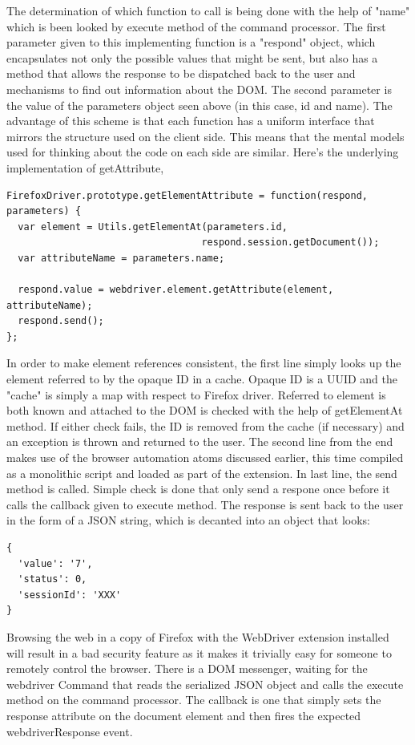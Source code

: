 \documentclass[article,type=msc,colorback,accentcolor=tud9c,twoside,11pt]{tudthesis}
\begin{document}
The determination of which function to call is being done with the help of "name" which is been looked by execute method of the command processor. The first parameter given to this implementing function is a "respond" object, which encapsulates not only the possible values that might be sent, but also has a method that allows the response to be dispatched back to the user and mechanisms to find out information about the DOM. The second parameter is the value of the parameters object seen above (in this case, id and name). The advantage of this scheme is that each function has a uniform interface that mirrors the structure used on the client side. This means that the mental models used for thinking about the code on each side are similar. Here's the underlying implementation of getAttribute,
 
 \begin{lstlisting}
FirefoxDriver.prototype.getElementAttribute = function(respond, parameters) {
  var element = Utils.getElementAt(parameters.id,
                                  respond.session.getDocument());
  var attributeName = parameters.name;

  respond.value = webdriver.element.getAttribute(element, attributeName);
  respond.send();
};
\end{lstlisting}

In order to make element references consistent, the first line simply looks up the element referred to by the opaque ID in a cache. Opaque ID is a UUID and the "cache" is simply a map with respect to Firefox driver. Referred to element is both known and attached to the DOM is checked with the help of getElementAt method. If either check fails, the ID is removed from the cache (if necessary) and an exception is thrown and returned to the user.
The second line from the end makes use of the browser automation atoms discussed earlier, this time compiled as a monolithic script and loaded as part of the extension.
In last line, the send method is called. Simple check is done that only send a respone once before it calls the callback given to execute method. The response is sent back to the user in the form of a JSON string, which is decanted into an object that looks:
\begin{lstlisting}
{
  'value': '7',
  'status': 0,
  'sessionId': 'XXX'
}
\end{lstlisting}
Browsing the web in a copy of Firefox with the WebDriver extension installed will result in a bad security feature as it makes it trivially easy for someone to remotely control the browser.
There is a DOM messenger, waiting for the webdriver Command that reads the serialized JSON object and calls the execute method on the command processor. The callback is one that simply sets the response attribute on the document element and then fires the expected webdriverResponse event.
\end{document}
